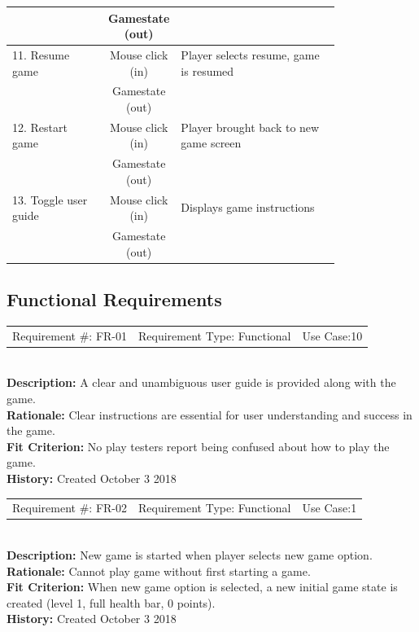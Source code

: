 \documentclass[12pt, titlepage]{article}
\begin{document}
\begin{table}[H]
\begin{center}
\begin{tabular}{p{0.3\linewidth} | c | p{0.5\linewidth}}
                      & Gamestate (out)  & \\
        \hline
        11. Resume game & Mouse click (in) & Player selects resume, game is resumed \\
                        & Gamestate (out) &\\
        \hline
        12. Restart game & Mouse click (in) & Player brought back to new game screen \\
                        & Gamestate (out)  &\\
        \hline
        13. Toggle user guide & Mouse click (in) & Displays game instructions \\
                              & Gamestate (out)  &\\
        \end{tabular}
    \end{center}
\end{table}

\subsection{Functional Requirements}


\begin{reqbox}
	\begin{tabular}{c|c|c}
		Requirement \#: FR-01 & Requirement Type: Functional & Use Case:10 \\
	\end{tabular} \\
	\textbf{Description:} A clear and unambiguous user guide is provided along with the game. \\
	\textbf{Rationale:}  Clear instructions are essential for user understanding and success in the game. \\
	\textbf{Fit Criterion:} No play testers report being confused about how to play the game. \\
	\textbf{History:} Created October 3 2018
\end{reqbox}

\begin{reqbox}
	\begin{tabular}{c|c|c}
		Requirement \#: FR-02 & Requirement Type: Functional & Use Case:1 \\
	\end{tabular} \\
	\textbf{Description:} New game is started when player selects new game option. \\
	\textbf{Rationale:} Cannot play game without first starting a game. \\
	\textbf{Fit Criterion:} When new game option is selected, a new initial game state is created (level 1, full health bar, 0 points). \\
	\textbf{History:} Created October 3 2018
\end{reqbox}
\end{document}

